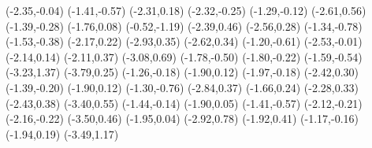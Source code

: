 \psdot[](-2.35,-0.04)
\psdot[](-1.41,-0.57)
\psdot[](-2.31,0.18)
\psdot[](-2.32,-0.25)
\psdot[](-1.29,-0.12)
\psdot[](-2.61,0.56)
\psdot[](-1.39,-0.28)
\psdot[](-1.76,0.08)
\psdot[](-0.52,-1.19)
\psdot[](-2.39,0.46)
\psdot[](-2.56,0.28)
\psdot[](-1.34,-0.78)
\psdot[](-1.53,-0.38)
\psdot[](-2.17,0.22)
\psdot[](-2.93,0.35)
\psdot[](-2.62,0.34)
\psdot[](-1.20,-0.61)
\psdot[](-2.53,-0.01)
\psdot[](-2.14,0.14)
\psdot[](-2.11,0.37)
\psdot[](-3.08,0.69)
\psdot[](-1.78,-0.50)
\psdot[](-1.80,-0.22)
\psdot[](-1.59,-0.54)
\psdot[](-3.23,1.37)
\psdot[](-3.79,0.25)
\psdot[](-1.26,-0.18)
\psdot[](-1.90,0.12)
\psdot[](-1.97,-0.18)
\psdot[](-2.42,0.30)
\psdot[](-1.39,-0.20)
\psdot[](-1.90,0.12)
\psdot[](-1.30,-0.76)
\psdot[](-2.84,0.37)
\psdot[](-1.66,0.24)
\psdot[](-2.28,0.33)
\psdot[](-2.43,0.38)
\psdot[](-3.40,0.55)
\psdot[](-1.44,-0.14)
\psdot[](-1.90,0.05)
\psdot[](-1.41,-0.57)
\psdot[](-2.12,-0.21)
\psdot[](-2.16,-0.22)
\psdot[](-3.50,0.46)
\psdot[](-1.95,0.04)
\psdot[](-2.92,0.78)
\psdot[](-1.92,0.41)
\psdot[](-1.17,-0.16)
\psdot[](-1.94,0.19)
\psdot[](-3.49,1.17)
